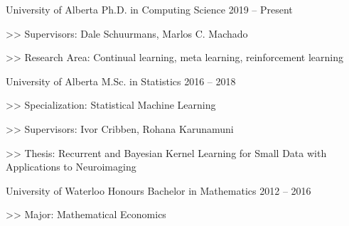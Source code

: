 \begin{cventries}
  \cventry
    {University of Alberta}
    {Ph.D. in Computing Science}
    {2019 -- Present}
    {
      \begin{cvitems}
        \item[>>] {Supervisors: Dale Schuurmans, Marlos C. Machado}
        \item[>>] {Research Area: Continual learning, meta learning, reinforcement learning}
      \end{cvitems}
    }

  \cventry
    {University of Alberta}
    {M.Sc. in Statistics}
    {2016 -- 2018}
    {
      \begin{cvitems}
        \item[>>] {Specialization: Statistical Machine Learning}
        \item[>>] {Supervisors: Ivor Cribben, Rohana Karunamuni}
        \item[>>] {Thesis: Recurrent and Bayesian Kernel Learning for Small Data with Applications to Neuroimaging}
      \end{cvitems}
    }
  \cventry
    {University of Waterloo}
    {Honours Bachelor in Mathematics}
    {2012 -- 2016}
    {
      \begin{cvitems}
        \item[>>] Major: Mathematical Economics
      \end{cvitems}
    }
\end{cventries}

